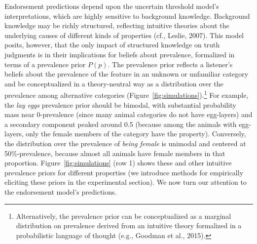 \documentclass[english,,man,floatsintext]{apa6}
\let\rmarkdownfootnote\footnote%
\def\footnote{\protect\rmarkdownfootnote}
\theoremstyle{definition}
\theoremstyle{definition}
\theoremstyle{definition}
\theoremstyle{remark}
\begin{document}
Endorsement predictions depend upon the uncertain threshold model's
interpretations, which are highly sensitive to background knowledge.
Background knowledge may be richly structured, reflecting intuitive
theories about the underlying causes of different kinds of properties
(cf., Leslie, 2007). This model posits, however, that the only impact of
structured knowledge on truth judgments is in their implications for
beliefs about prevalence, formalized in terms of a prevalence prior
\(P(p)\). The prevalence prior reflects a listener's beliefs about the
prevalence of the feature in an unknown or unfamiliar category and be
conceptualized in a theory-neutral way as a distribution over the
prevalence among alternative categories
(Figure~\ref{fig:simulations}).\footnote{Alternatively, the prevalence
  prior can be conceptualized as a marginal distribution on prevalence
  derived from an intuitive theory formalized in a probabilistic
  language of thought (e.g., Goodman et al., 2015). } For example, the
\emph{lay eggs} prevalence prior should be bimodal, with substantial
probability mass near 0-prevalence (since many animal categories do not
have egg-layers) and a secondary component peaked around 0.5 (because
among the animals with egg-layers, only the female members of the
category have the property). Conversely, the distribution over the
prevalence of \emph{being female} is unimodal and centered at
50\%-prevalence, because almost all animals have female members in that
proportion. Figure~\ref{fig:simulations} (row 1) shows these and other
intuitive prevalence priors for different properties (we introduce
methods for empirically eliciting these priors in the experimental
section). We now turn our attention to the endorsement model's
predictions.
\end{document}
